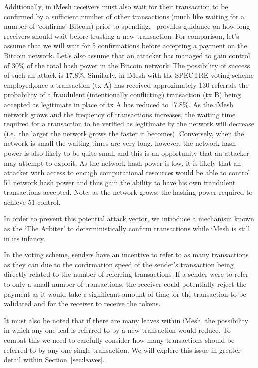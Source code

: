 \documentclass[a4paper,10pt,twocolumn]{article}
\begin{document}
 Additionally, in iMesh receivers must also wait for their transaction to be confirmed by a sufficient number of other transactions 
 (much like waiting for a number of `confirms' Bitcoin) prior to spending.~\cite{spectre} provides guidance on how long receivers 
 should wait before trusting a new transaction. For comparison, let's assume that we will wait for 5 confirmations before accepting a 
 payment on the Bitcoin network. Let's also assume that an attacker has managed to gain control of 30\% of the total hash power in the 
 Bitcoin network. The possibility of success of such an attack is 17.8\%\cite{btc}. Similarly, in iMesh with the SPECTRE voting scheme 
 employed,once a transaction (tx A) has received approximately 130 referrals the probability of a fraudulent (intentionally conflicting) 
 transaction (tx B) being accepted as legitimate in place of tx A has reduced to 17.8\%. As the iMesh network grows and the frequency of 
 transactions increases, the waiting time required for a transaction to be verified as legitimate by the network will decrease (i.e.\ the 
 larger the network grows the faster it becomes). Conversely, when the network is small the waiting times are very long, however, the 
 network hash power is also likely to be quite small and this is an opportunity that an attacker may attempt to exploit. As the network 
 hash power is low, it is likely that an attacker with access to enough computational resources would be able to control 51%
 network hash power and thus gain the ability to have his own fraudulent transactions accepted. Note: as the network grows, the hashing 
 power required to achieve 51%
 control.
 
In order to prevent this potential attack vector, we introduce a mechanism known as the `The Arbiter' to deterministically confirm transactions while iMesh is still in its infancy.

In the voting scheme, senders have an incentive to refer to as many transactions as they can due to the confirmation speed of the 
sender's transaction being directly related to the number of referring transactions. If a sender were to refer to only a small number of 
transactions, the receiver could potentially reject the payment as it would take a significant amount of time for the transaction to be 
validated and for the receiver to receive the tokens.

It must also be noted that if there are many leaves within iMesh, the possibility in which any one leaf is referred to by a new 
transaction would reduce. To combat this we need to carefully consider how many transactions should be referred to by any one single 
transaction. We will explore this issue in greater detail within Section~\ref{sec:leaves}.
\end{document}
